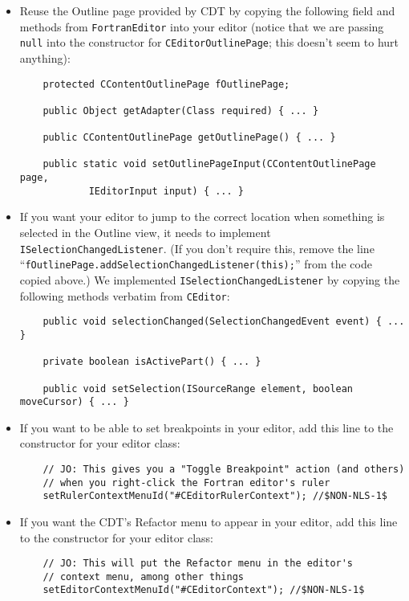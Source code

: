 \begin{itemize}
\item Reuse the Outline page provided by CDT by copying the following
field and methods from \texttt{FortranEditor} into
your editor (notice that we are passing \texttt{null} into the
constructor for \texttt{CEditorOutlinePage}; this doesn't seem to hurt
anything):
\begin{verbatim}
    protected CContentOutlinePage fOutlinePage;

    public Object getAdapter(Class required) { ... }

    public CContentOutlinePage getOutlinePage() { ... }

    public static void setOutlinePageInput(CContentOutlinePage page,
            IEditorInput input) { ... }
\end{verbatim}

\item If you want your editor to jump to the correct location when something
is selected in the Outline view, it needs to implement
\texttt{ISelectionChangedListener}.  (If you don't require this, remove
the line ``\texttt{fOutlinePage.addSelectionChangedListener(this);}''
from the code copied above.)  We implemented \texttt{ISelectionChangedListener}
by copying the following methods verbatim from \texttt{CEditor}:
\begin{verbatim}
    public void selectionChanged(SelectionChangedEvent event) { ... }

    private boolean isActivePart() { ... }

    public void setSelection(ISourceRange element, boolean moveCursor) { ... }
\end{verbatim}

\item If you want to be able to set breakpoints in your editor, add this
line to the constructor for your editor class:
\begin{verbatim}
    // JO: This gives you a "Toggle Breakpoint" action (and others)
    // when you right-click the Fortran editor's ruler
    setRulerContextMenuId("#CEditorRulerContext"); //$NON-NLS-1$
\end{verbatim}

\item If you want the CDT's Refactor menu to appear in your editor, add this
line to the constructor for your editor class:
\begin{verbatim}
    // JO: This will put the Refactor menu in the editor's
    // context menu, among other things
    setEditorContextMenuId("#CEditorContext"); //$NON-NLS-1$
\end{verbatim}

\end{itemize}

